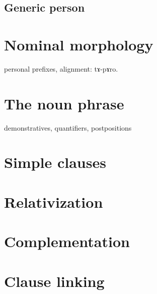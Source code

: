 \documentclass[oldfontcommands,oneside,a4paper,11pt]{article}
\begin{document}
\subsection{Generic person}

\section{Nominal morphology}

personal prefixes, alignment: tɤ-pɤro.

\section{The noun phrase} 
demonstratives, quantifiers, postpositions

\section{Simple clauses} 

\section{Relativization}

\section{Complementation}

\section{Clause linking}



\citet{jacques08}

\citet{jacques04these}
\citet{jacques14linking}



\end{document}
